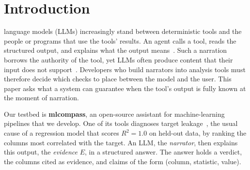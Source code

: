 \documentclass[journal]{IEEEtran}
\begin{document}
\section{Introduction}\label{sec:intro}

 language models (LLMs) increasingly stand between
deterministic tools and the people or programs that use the tools' results. An
agent calls a tool, reads the structured output, and explains what the output
means~\cite{react,toolformer,mcp}. Such a narration borrows the authority of the
tool, yet LLMs often produce content that their input does not
support~\cite{ji,huang}. Developers who build narrators into analysis tools must
therefore decide which checks to place between the model and the user. This
paper asks what a system can guarantee when the tool's output is fully known at
the moment of narration.

Our testbed is \textbf{mlcompass}, an open-source assistant for
machine-learning pipelines that we develop. One of its tools diagnoses target
leakage~\cite{leakage}, the usual cause of a regression model that scores
$R^2=1.0$ on held-out data, by ranking the columns most correlated with the
target. An LLM, the \emph{narrator}, then explains this output, the
\emph{evidence} $E$, in a structured answer. The answer holds a verdict, the
columns cited as evidence, and claims of the form (column, statistic, value).
\end{document}
